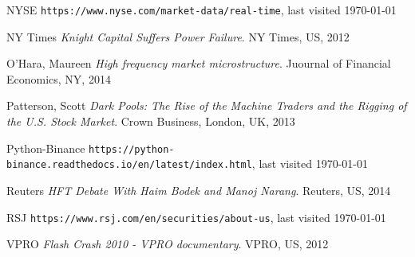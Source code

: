\documentclass[12pt]{article}
\begin{document}
\begin{thebibliography}{9}
NYSE
\texttt{https://www.nyse.com/market-data/real-time}, last visited \today

NY Times
\textit{Knight Capital Suffers Power Failure}.
NY Times, US, 2012

O'Hara, Maureen 
\textit{High frequency market microstructure}.
Juournal of Financial Economics, NY, 2014

Patterson, Scott
\textit{Dark Pools: The Rise of the Machine Traders and the Rigging of the U.S. Stock Market}.
Crown Business, London, UK, 2013

Python-Binance
\texttt{https://python-binance.readthedocs.io/en/latest/index.html}, last visited \today

Reuters
\textit{HFT Debate With Haim Bodek and Manoj Narang}.
Reuters, US, 2014

RSJ
\texttt{https://www.rsj.com/en/securities/about-us}, last visited \today

VPRO
\textit{Flash Crash 2010 - VPRO documentary}.
VPRO, US, 2012

\end{thebibliography}
\end{document}
